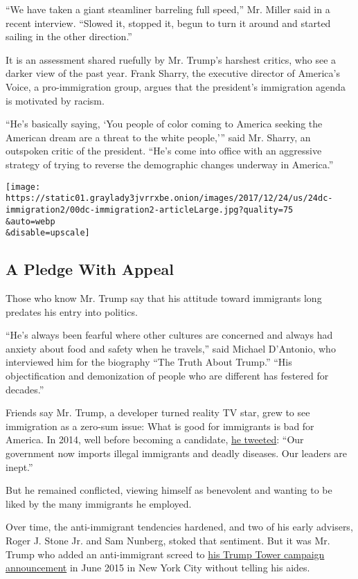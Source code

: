 ``We have taken a giant steamliner barreling full speed,'' Mr. Miller
said in a recent interview. ``Slowed it, stopped it, begun to turn it
around and started sailing in the other direction.''

It is an assessment shared ruefully by Mr. Trump's harshest critics, who
see a darker view of the past year. Frank Sharry, the executive director
of America's Voice, a pro-immigration group, argues that the president's
immigration agenda is motivated by racism.

``He's basically saying, `You people of color coming to America seeking
the American dream are a threat to the white people,''' said Mr. Sharry,
an outspoken critic of the president. ``He's come into office with an
aggressive strategy of trying to reverse the demographic changes
underway in America.''

\texttt{[image: https://static01.graylady3jvrrxbe.onion/images/2017/12/24/us/24dc-immigration2/00dc-immigration2-articleLarge.jpg?quality=75\\\&auto=webp\\\&disable=upscale]}

\hypertarget{a-pledge-with-appeal}{%
\subsection{A Pledge With Appeal}\label{a-pledge-with-appeal}}

Those who know Mr. Trump say that his attitude toward immigrants long
predates his entry into politics.

``He's always been fearful where other cultures are concerned and always
had anxiety about food and safety when he travels,'' said Michael
D'Antonio, who interviewed him for the biography ``The Truth About
Trump.'' ``His objectification and demonization of people who are
different has festered for decades.''

Friends say Mr. Trump, a developer turned reality TV star, grew to see
immigration as a zero-sum issue: What is good for immigrants is bad for
America. In 2014, well before becoming a candidate,
\href{https://twitter.com/realdonaldtrump/status/496640747379388416?ref_src=twcamp\%5Eshare\%7Ctwsrc\%5Eios\%7Ctwgr\%5Ecom.google.Gmail.ShareExtension}{he
tweeted}: ``Our government now imports illegal immigrants and deadly
diseases. Our leaders are inept.''

But he remained conflicted, viewing himself as benevolent and wanting to
be liked by the many immigrants he employed.

Over time, the anti-immigrant tendencies hardened, and two of his early
advisers, Roger J. Stone Jr. and Sam Nunberg, stoked that sentiment. But
it was Mr. Trump who added an anti-immigrant screed to
\href{https://www.nytimes3xbfgragh.onion/2015/06/17/us/politics/donald-trump-runs-for-president-this-time-for-real-he-says.html}{his
Trump Tower campaign announcement} in June 2015 in New York City without
telling his aides.

